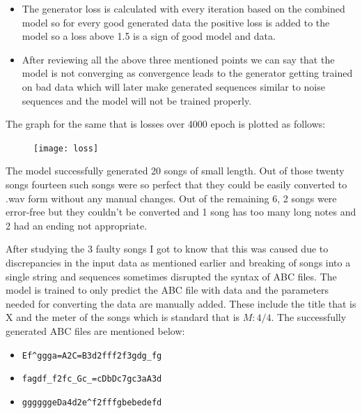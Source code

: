 \documentclass[oneside,12pt]{Classes/RoboticsLaTeX}
\begin{document}
\begin{itemize}
  \item The generator loss is calculated with every iteration based on the combined model so for every good generated data the positive loss is added to the model so a loss above 1.5 is a sign of good model and data.
\end{itemize}

\begin{itemize}
  \item After reviewing all the above three mentioned points we can say that the model is not converging as convergence leads to the generator getting trained on bad data which will later make generated sequences similar to noise sequences and the model will not be trained properly.
\end{itemize}

The graph for the same that is losses over 4000 epoch is plotted as follows:

\begin{figure}[H]
  \texttt{[image: loss]}
\end{figure}

The model successfully generated 20 songs of small length. Out of those twenty songs fourteen such songs were so perfect that they could be easily converted to .wav form without any manual changes. Out of the remaining 6, 2 songs were error-free but they couldn't be converted and 1 song has too many long notes and 2 had an ending not appropriate.

After studying the 3 faulty songs I got to know that this was caused due to discrepancies in the input data as mentioned earlier and breaking of songs into a single string and sequences sometimes disrupted the syntax of ABC files. The model is trained to only predict the ABC file with data and the parameters needed for converting the data are manually added. These include the title that is X and the meter of the songs which is standard that is $M:4/4$. 
The successfully generated ABC files are mentioned below:

\begin{itemize}
  \item \verb|Ef^ggga=A2C=B3d2fff2f3gdg_fg|
\end{itemize}

\begin{itemize}
  \item \verb|fagdf_f2fc_Gc_=cDbDc7gc3aA3d|
\end{itemize}

\begin{itemize}
  \item \verb|ggggggeDa4d2e^f2fffgbebedefd|
\end{itemize}
\end{document}
